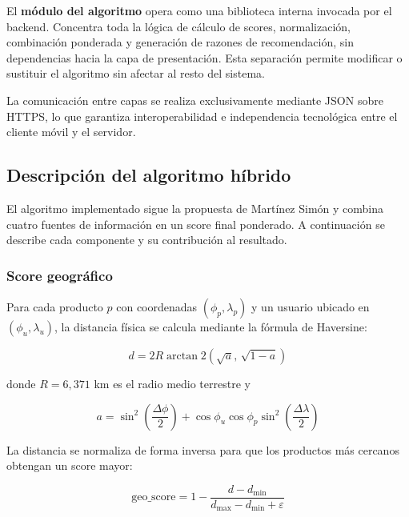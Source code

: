 \documentclass[11pt, letterpaper]{article}
\begin{document}
	El \textbf{módulo del algoritmo} opera como una biblioteca interna invocada por
	el backend. Concentra toda la lógica de cálculo de scores, normalización,
	combinación ponderada y generación de razones de recomendación, sin
	dependencias hacia la capa de presentación. Esta separación permite modificar
	o sustituir el algoritmo sin afectar al resto del sistema.
	
	La comunicación entre capas se realiza exclusivamente mediante JSON sobre HTTPS,
	lo que garantiza interoperabilidad e independencia tecnológica entre el cliente
	móvil y el servidor.
	
	\subsection{Descripción del algoritmo híbrido}
	
	El algoritmo implementado sigue la propuesta de Martínez Simón
	\autocite{dael_recomendacion_hibrida} y combina cuatro fuentes de información
	en un score final ponderado. A continuación se describe cada componente y su
	contribución al resultado.
	
	\subsubsection*{Score geográfico}
	
	Para cada producto $p$ con coordenadas $(\phi_p, \lambda_p)$ y un usuario
	ubicado en $(\phi_u, \lambda_u)$, la distancia física se calcula mediante la
	fórmula de Haversine:
	
	\begin{equation}
		d = 2R \arctan2\!\left(\sqrt{a},\, \sqrt{1-a}\right)
		\label{eq:haversine}
	\end{equation}
	
	\noindent donde $R = 6{,}371$ km es el radio medio terrestre y
	
	\begin{equation}
		a = \sin^2\!\left(\frac{\Delta\phi}{2}\right)
		+ \cos\phi_u \cos\phi_p \sin^2\!\left(\frac{\Delta\lambda}{2}\right)
		\label{eq:haversine_a}
	\end{equation}
	
	La distancia se normaliza de forma inversa para que los productos más cercanos
	obtengan un score mayor:
	
	\begin{equation}
		\text{geo\_score} = 1 - \frac{d - d_{\min}}{d_{\max} - d_{\min} + \varepsilon}
		\label{eq:geo_score}
	\end{equation}
	
\end{document}
